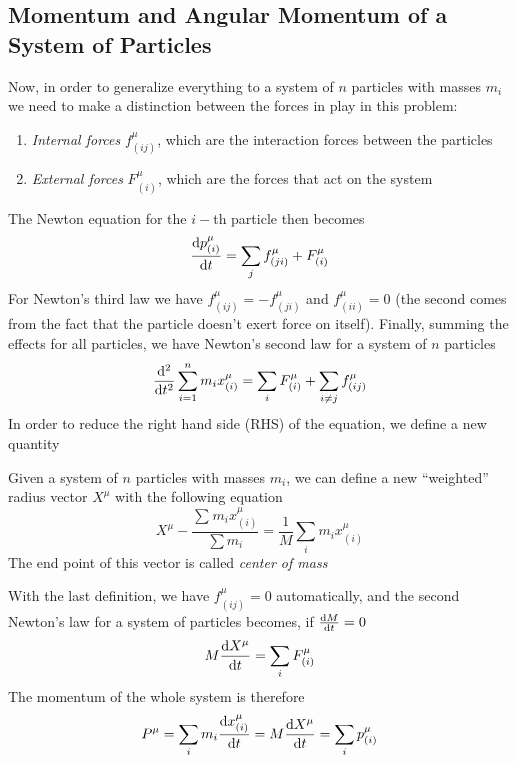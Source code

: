 \documentclass[../admech.tex]{subfiles}
\begin{document}
\subsection{Momentum and Angular Momentum of a System of Particles}
Now, in order to generalize everything to a system of $n$ particles with masses $m_i$ we need to make a distinction between the forces in play in this problem:
\begin{enumerate}
\item \emph{Internal forces} $f^\mu_{(ij)}$, which are the interaction forces between the particles
\item \emph{External forces} $F^\mu_{(i)}$, which are the forces that act on the system
\end{enumerate}
The Newton equation for the $i-$th particle then becomes
\begin{equation}
	\derivative{p^\mu_{(i)}}{t}=\sum_{j}^{}f_{(ji)}^\mu+F^\mu_{(i)}
	\label{eq:newtonsystem}
\end{equation}
For Newton's third law we have $f^\mu_{(ij)}=-f^\mu_{(ji)}$ and $f^\mu_{(ii)}=0$ (the second comes from the fact that the particle doesn't exert force on itself). Finally, summing the effects for all particles, we have Newton's second law for a system of $n$ particles
\begin{equation}
	\dv[2]{t}\sum_{i=1}^nm_ix^\mu_{(i)}=\sum_{i}^{}F^\mu_{(i)}+\sum_{i\ne j}^{}f^\mu_{(ij)}
	\label{eq:newton2system}
\end{equation}
In order to reduce the right hand side (RHS) of the equation, we define a new quantity
\begin{dfn}
	Given a system of $n$ particles with masses $m_i$, we can define a new ``weighted'' radius vector $X^\mu$ with the following equation
	\begin{equation}
		X^\mu-\frac{\sum_{}^{}m_ix^\mu_{(i)}}{\sum m_i}=\frac{1}{M}\sum_{i}^{}m_ix^\mu_{(i)}
		\label{eq:cmradius}
	\end{equation}
	The end point of this vector is called \emph{center of mass}
\end{dfn}
With the last definition, we have $f^\mu_{(ij)}=0$ automatically, and the second Newton's law for a system of particles becomes, if $\dv{M}{t}=0$
\begin{equation}
	M\dv{X^\mu}{t}=\sum_iF^\mu_{(i)}
	\label{eq:new2sys}
\end{equation}
The momentum of the whole system is therefore
\begin{equation}
	P^\mu=\sum_im_i\dv{x^\mu_{(i)}}{t}=M\dv{X^\mu}{t}=\sum_ip^\mu_{(i)}
	\label{eq:momsys}
\end{equation}
\end{document}

